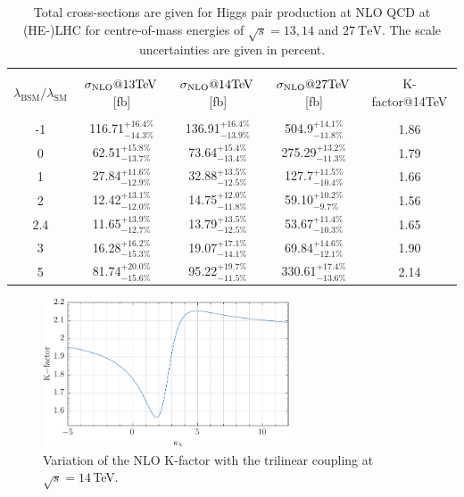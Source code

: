 \documentclass[a4paper]{jpconf}
\newcommand{\TeV}{\ensuremath{\mathrm{\:TeV}}}
\begin{document}
\begin{table}[htb!]
\begin{center}
\begin{tabular}{| c | c | c |c|c|}
\hline
&&&&\\
$\lambda_{\mathrm{BSM}}/\lambda_{\mathrm{SM}}$ & $\sigma_{\rm{NLO}}@13 \mathrm{TeV}$\,[fb]& $\sigma_{\rm{NLO}}@14 \mathrm{TeV}$\,[fb] & $\sigma_{\rm{NLO}}@27 \mathrm{TeV}$\,[fb] &K-factor@14TeV\\
&&&&\\
\hline
-1& 116.71$^{+16.4\%}_{-14.3\%}$  & 136.91$^{+16.4\%}_{-13.9\%}$& 504.9$^{+14.1\%}_{-11.8\%}$ & 1.86 \\
\hline
0& 62.51$^{+15.8\%}_{-13.7\%}$ & 73.64$^{+15.4\%}_{-13.4\%}$& 275.29$^{+13.2\%}_{-11.3\%}$& 1.79  \\
\hline 
1& 27.84$^{+11.6\%}_{-12.9\%}$ & 32.88$^{+13.5\%}_{-12.5\%}$&127.7$^{+11.5\%}_{-10.4\%}$ &1.66\\
\hline
2 & 12.42$^{+13.1\%}_{-12.0\%}$ & 14.75$^{+12.0\%}_{-11.8\%}$ &  59.10$^{+10.2\%}_{-9.7\%}$ & 1.56 \\
\hline
2.4& 11.65$^{+13.9\%}_{-12.7\%}$ & 13.79$^{+13.5\%}_{-12.5\%}$& 53.67$^{+11.4\%}_{-10.3\%}$ & 1.65 \\
\hline
3& 16.28$^{+16.2\%}_{-15.3\%}$ & 19.07$^{+17.1\%}_{-14.1\%}$ & 69.84$^{+14.6\%}_{-12.1\%}$ & 1.90 \\
\hline 
5& 81.74$^{+20.0\%}_{-15.6\%}$  & 95.22$^{+19.7\%}_{-11.5\%}$& 330.61$^{+17.4\%}_{-13.6\%}$ & 2.14 \\
\hline 
\end{tabular}
\end{center}
\caption{Total cross-sections are given for Higgs pair production at NLO QCD at (HE-)LHC for centre-of-mass energies of $\sqrt{s}=13,14$ and $27 \TeV$. The scale uncertainties are given in percent.
\label{tab:sigmatot}}
\end{table}

\begin{figure}[htb]
  \centering
    \includegraphics[width=0.65\textwidth]{plots/Kfactor.pdf}
\caption{Variation of the NLO K-factor with the trilinear coupling at $\sqrt{s}=14$\,TeV.}
\label{fig:Kfacvariation}
\end{figure}
\end{document}
